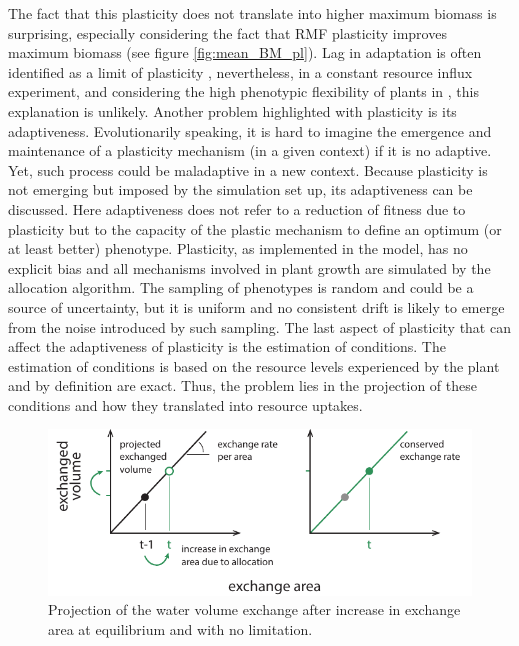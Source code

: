 The fact that this plasticity does not translate into higher maximum biomass is surprising, especially considering the fact that RMF plasticity improves maximum biomass (see figure \ref{fig:mean_BM_pl}). Lag in adaptation is often identified as a limit of plasticity \parencite{dewitt_costs_1998, van_kleunen_constraints_2005}, nevertheless, in a constant resource influx experiment, and considering the high phenotypic flexibility of plants in \model, this explanation is unlikely. Another problem highlighted with plasticity is its adaptiveness. Evolutionarily speaking, it is hard to imagine the emergence and maintenance of a plasticity mechanism (in a given context) if it is no adaptive. Yet, such process could be maladaptive in a new context. Because plasticity is not emerging but imposed by the simulation set up, its adaptiveness can be discussed. Here adaptiveness does not refer to a reduction of fitness due to plasticity but to the capacity of the plastic mechanism to define an optimum (or at least better) phenotype. Plasticity, as implemented in the model, has no explicit bias and all mechanisms involved in plant growth are simulated by the allocation algorithm. The sampling of phenotypes is random and could be a source of uncertainty, but it is uniform and no consistent drift is likely to emerge from the noise introduced by such sampling. The last aspect of plasticity that can affect the adaptiveness of plasticity is the estimation of conditions. The estimation of conditions is based on the resource levels experienced by the plant and by definition are exact. Thus, the problem lies in the projection of these conditions and how they translated into resource uptakes.


\begin{figure}
\includegraphics[width = \textwidth]{./2_PP/Figures/Concepts/exchange_volume_projection.pdf}
\caption{Projection of the water volume exchange after increase in exchange area at equilibrium and with no limitation.}\label{fig:exchange_volume_projection}
\end{figure}

